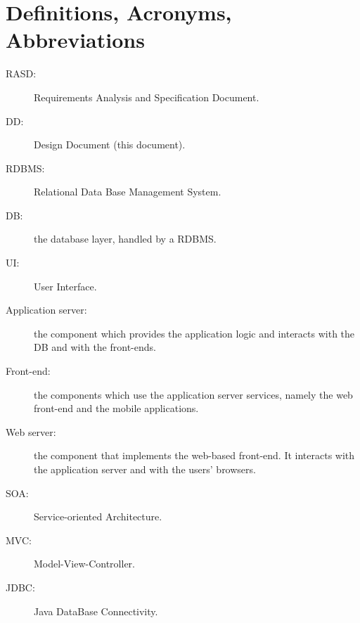 \section{Definitions, Acronyms, Abbreviations}
\label{sec:definitions}

\begin{description}
\item[RASD:] Requirements Analysis and Specification Document.
\item[DD:] Design Document (this document).
\item[RDBMS:] Relational Data Base Management System.
\item[DB:] the database layer, handled by a RDBMS.
\item[UI:] User Interface.
\item[Application server:] the component which provides the application logic and interacts with the DB and with the front-ends.
\item[Front-end:] the components which use the application server services, namely the web front-end and the mobile applications.
\item[Web server:] the component that implements the web-based front-end. It interacts with the application server and with the users' browsers.
\item[SOA:] Service-oriented Architecture.
\item[MVC:] Model-View-Controller.
\item[JDBC:] Java DataBase Connectivity.
\end{description}
